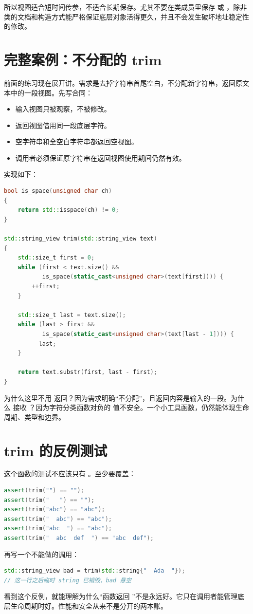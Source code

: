 所以视图适合短时间传参，不适合长期保存。尤其不要在类成员里保存  或 ，除非类的文档和构造方式能严格保证底层对象活得更久，并且不会发生破坏地址稳定性的修改。

\section{完整案例：不分配的 trim}

前面的练习现在展开讲。需求是去掉字符串首尾空白，不分配新字符串，返回原文本中的一段视图。先写合同：

\begin{itemize}
  \item 输入视图只被观察，不被修改。
  \item 返回视图借用同一段底层字符。
  \item 空字符串和全空白字符串都返回空视图。
  \item 调用者必须保证原字符串在返回视图使用期间仍然有效。
\end{itemize}

实现如下：

\begin{lstlisting}[language=C++,caption={返回子串视图的 trim}]
bool is_space(unsigned char ch)
{
    return std::isspace(ch) != 0;
}

std::string_view trim(std::string_view text)
{
    std::size_t first = 0;
    while (first < text.size() &&
           is_space(static_cast<unsigned char>(text[first]))) {
        ++first;
    }

    std::size_t last = text.size();
    while (last > first &&
           is_space(static_cast<unsigned char>(text[last - 1]))) {
        --last;
    }

    return text.substr(first, last - first);
}
\end{lstlisting}

为什么这里不用  返回？因为需求明确“不分配”，且返回内容是输入的一段。为什么  接收 ？因为字符分类函数对负的  值不安全。一个小工具函数，仍然能体现生命周期、类型和边界。

\section{trim 的反例测试}

这个函数的测试不应该只有 。至少要覆盖：

\begin{lstlisting}[language=C++,caption={trim 的边界测试}]
assert(trim("") == "");
assert(trim("   ") == "");
assert(trim("abc") == "abc");
assert(trim("  abc") == "abc");
assert(trim("abc  ") == "abc");
assert(trim("  abc  def  ") == "abc  def");
\end{lstlisting}

再写一个不能做的调用：

\begin{lstlisting}[language=C++,caption={不要保存临时字符串的 trim 结果}]
std::string_view bad = trim(std::string{"  Ada  "});
// 这一行之后临时 string 已销毁，bad 悬空
\end{lstlisting}

看到这个反例，就能理解为什么“函数返回 ”不是永远好。它只在调用者能管理底层生命周期时好。性能和安全从来不是分开的两本账。
